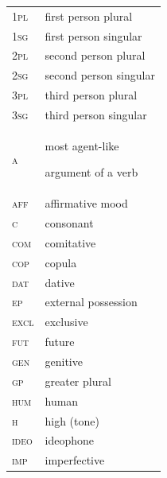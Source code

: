 \documentclass[output=paper]{langsci/langscibook}
\begin{document}
\begin{tabularx}{.45\textwidth}{lX}

\textsc{1pl}   &  first person plural \\

\textsc{1sg}  &  first person singular \\

\textsc{2pl}   &  second person plural \\

\textsc{2sg}   &  second person singular \\

\textsc{3pl}  &   third person plural \\

\textsc{3sg}  &   third person singular \\

\textsc{a}   &  most agent-like

 argument of a verb \\

\textsc{aff}  &   affirmative mood \\

\textsc{c}  &  consonant \\

\textsc{com}   & comitative \\

\textsc{cop}  &  copula \\

\textsc{dat}  &   dative \\

\textsc{ep}  &   external possession \\

\textsc{excl}  &   exclusive \\

\textsc{fut}  &  future \\

\textsc{gen}  &  genitive \\

\textsc{gp}  &  greater plural \\

\textsc{hum}  &  human \\

\textsc{h} &   high (tone) \\

\textsc{ideo} &   ideophone \\

\textsc{imp}  &  imperfective \\


\end{tabularx}
\end{document}

